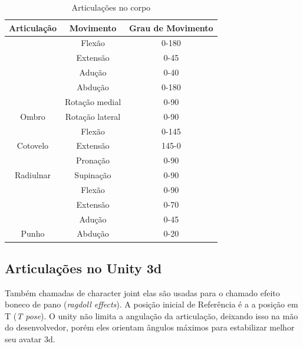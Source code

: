    \begin{table}[H]
   \centering
   \caption{Articulações no corpo}
   \label{Juntas no corpo}
   \begin{tabular}{|c|c|c|}
   \hline
   \rowcolor[HTML]{C0C0C0}
   Articulação                 & Movimento       & Grau de  Movimento \\ \hline
                               & Flexão          & 0-180              \\ \cline{2-3}
                               & Extensão        & 0-45               \\ \cline{2-3}
                               & Adução          & 0-40               \\ \cline{2-3}
                               & Abdução         & 0-180              \\ \cline{2-3}
                               & Rotação medial  & 0-90               \\ \cline{2-3}
   \multirow{-6}{*}{Ombro}     & Rotação lateral & 0-90               \\ \hline
                               & Flexão          & 0-145              \\ \cline{2-3}
   \multirow{-2}{*}{Cotovelo}  & Extensão        & 145-0              \\ \hline
                               & Pronação        & 0-90               \\ \cline{2-3}
   \multirow{-2}{*}{Radiulnar} & Supinação       & 0-90               \\ \hline
                               & Flexão          & 0-90               \\ \cline{2-3}
                               & Extensão        & 0-70               \\ \cline{2-3}
                               & Adução          & 0-45               \\ \cline{2-3}
   \multirow{-4}{*}{Punho}     & Abdução         & 0-20               \\ \hline
   \end{tabular}
   \end{table}


  \subsection{Articulações no Unity 3d}
  \label{sec:Articulacoes no Unity 3d}
    Também chamadas de character joint elas são usadas para o chamado efeito
  boneco de pano (\textit{ragdoll effects}). A posição inicial de Referência é a
  a posição em T (\textit{T pose}). O unity não limita a angulação da articulação,
  deixando isso na mão do desenvolvedor, porém eles orientam ângulos máximos
  para estabilizar melhor seu avatar 3d\cite{unity3dManual}.


